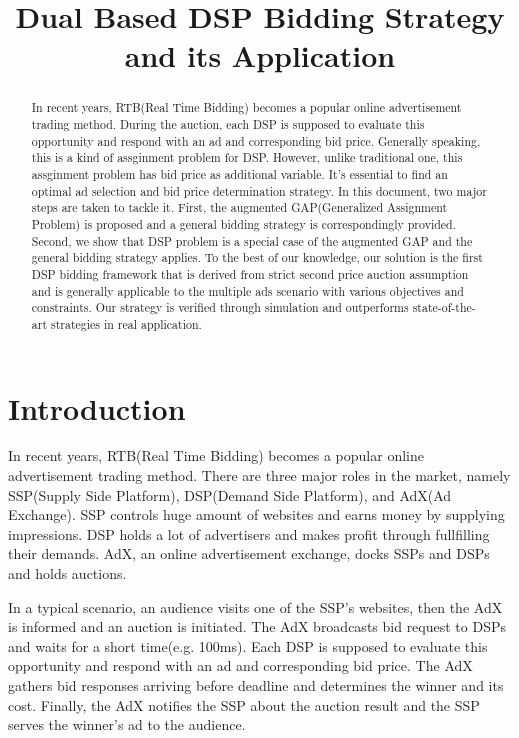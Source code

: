 \documentclass[sigconf]{acmart}
\begin{document}
\title{Dual Based DSP Bidding Strategy and its Application}

\begin{abstract}
In recent years, RTB(Real Time Bidding) becomes a popular online advertisement trading method.
During the auction, each DSP is supposed to evaluate this opportunity and respond with an ad and corresponding bid price.
Generally speaking, this is a kind of assginment problem for DSP.
However, unlike traditional one, this assginment problem has bid price as additional variable.
It's essential to find an optimal ad selection and bid price determination strategy.
In this document, two major steps are taken to tackle it.
First, the augmented GAP(Generalized Assignment Problem) is proposed and a general bidding strategy is correspondingly provided.
Second, we show that DSP problem is a special case of the augmented GAP and the general bidding strategy applies.
To the best of our knowledge, our solution is the first DSP bidding framework
    that is derived from strict second price auction assumption
    and is generally applicable to the multiple ads scenario with various objectives and constraints.
Our strategy is verified through simulation and outperforms state-of-the-art strategies in real application.
\end{abstract}

\maketitle

\section{Introduction}

In recent years, RTB(Real Time Bidding) becomes a popular online advertisement trading method.
There are three major roles in the market, namely SSP(Supply Side Platform), DSP(Demand Side Platform), and AdX(Ad Exchange).
SSP controls huge amount of websites and earns money by supplying impressions.
DSP holds a lot of advertisers and makes profit through fullfilling their demands.
AdX, an online advertisement exchange, docks SSPs and DSPs and holds auctions.

In a typical scenario, an audience visits one of the SSP's websites, then the AdX is informed and an auction is initiated.
The AdX broadcasts bid request to DSPs and waits for a short time(e.g. 100ms).
Each DSP is supposed to evaluate this opportunity and respond with an ad and corresponding bid price.
The AdX gathers bid responses arriving before deadline and determines the winner and its cost.
Finally, the AdX notifies the SSP about the auction result and the SSP serves the winner's ad to the audience.
\end{document}
